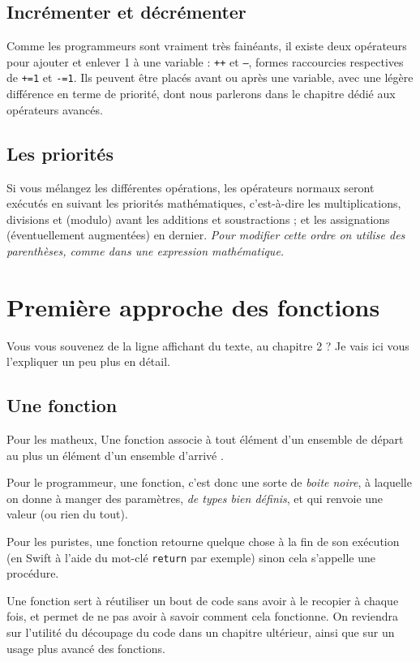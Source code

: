 \subsection{Incrémenter et décrémenter}
Comme les programmeurs sont vraiment très fainéants, il existe deux opérateurs pour ajouter et enlever 1 à une variable : \texttt{++} et \texttt{--}, formes raccourcies respectives de \texttt{+=1} et \texttt{-=1}. Ils peuvent être placés avant ou après une variable, avec une légère différence en terme de priorité, dont nous parlerons dans le chapitre dédié aux opérateurs avancés.

\subsection{Les priorités}
Si vous mélangez les différentes opérations, les opérateurs normaux seront exécutés en suivant les priorités mathématiques, c'est-à-dire les multiplications, divisions et (modulo) avant les additions et soustractions ; et les assignations (éventuellement augmentées) en dernier.
\emph{Pour modifier cette ordre on utilise des parenthèses, comme dans une expression mathématique.}

\pagebreak

\section{Première approche des fonctions}
Vous vous souvenez de la ligne affichant du texte, au chapitre 2 ? Je vais ici vous l'expliquer un peu plus en détail.

\subsection{Une fonction}
Pour les matheux, \og Une fonction associe à tout élément d'un ensemble de départ au plus un élément d'un ensemble d'arrivé \fg{}.

Pour le programmeur, une fonction, c'est donc une sorte de \emph{boite noire}, à laquelle on donne à manger des paramètres, \emph{de types bien définis}, et qui renvoie une valeur (ou rien du tout).

Pour les puristes, une fonction retourne quelque chose à la fin de son exécution (en Swift à l'aide du mot-clé \texttt{return} par exemple) sinon cela s'appelle une procédure.

Une fonction sert à réutiliser un bout de code sans avoir à le recopier à chaque fois, et permet de ne pas avoir à savoir comment cela fonctionne.
On reviendra sur l'utilité du découpage du code dans un chapitre ultérieur,
ainsi que sur un usage plus avancé des fonctions.

